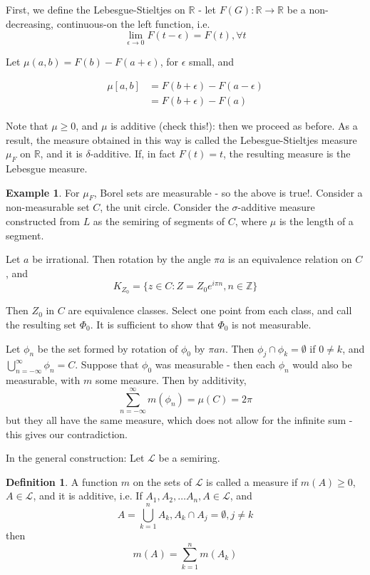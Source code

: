 \documentclass[11pt,a4paper]{report}
\theoremstyle{plain}
\theoremstyle{definition}
\newtheorem*{defn}{Definition}
\newtheorem*{eg}{Example}
\theoremstyle{remark}
\newcommand{\intersection}{\cap}
\newcommand{\Union}{\bigcup}
\newcommand{\R}{\mathbb{R}}
\newcommand{\Z}{\mathbb{Z}}
\newcommand{\cL}{\mathcal{L}}
\begin{document}
First, we define the Lebesgue-Stieltjes on $\R$ - let $F(G): \R \rightarrow \R$ be a non-decreasing, continuous-on the left function, i.e. $$ \lim_{\epsilon \rightarrow 0} F(t - \epsilon) = F(t), \forall t $$

Let $\mu(a, b) = F(b) - F(a + \epsilon)$, for $\epsilon$ small, and 

\begin{align*}
    \mu[a, b] &= F(b + \epsilon) - F(a - \epsilon) \\
              &= F(b + \epsilon) - F(a)
\end{align*}

Note that $\mu \ge 0$, and $\mu$ is additive (check this!): then we proceed as before. As a result, the measure obtained in this way is called the Lebesgue-Stieltjes measure $\mu_F$ on $\R$, and it is $\delta$-additive. If, in fact $F(t) = t$, the resulting measure is the Lebesgue measure.

\begin{eg}
  For $\mu_F$, Borel sets are measurable - so the above is true!. Consider a non-measurable set $C$, the unit circle. Consider the $\sigma$-additive measure constructed from $L$ as the semiring of segments of $C$, where $\mu$ is the length of a segment.

  Let $a$ be irrational. Then rotation by the angle $\pi a$ is an equivalence relation on $C$, and $$ K_{Z_0} = \{ z \in C : Z = Z_0 e^{i\pi n}, n \in \Z \} $$

    Then $Z_{0}$ in $C$ are equivalence classes. Select one point from each class, and call the resulting set $\Phi_{0}$. It is sufficient to show that $\Phi_0$ is not measurable.

    Let $\phi_n$ be the set formed by rotation of $\phi_0$ by $\pi a n$. Then $\phi_j \intersection \phi_k = \emptyset$ if $0 \ne k$, and $\Union_{n = -\infty}^\infty \phi_n = C $. Suppose that $\phi_0$ was measurable - then each $\phi_n$ would also be measurable, with $m$ some measure. Then by additivity, $$ \sum_{n = -\infty}^\infty m(\phi_n) = \mu(C) = 2\pi $$ but they all have the same measure, which does not allow for the infinite sum - this gives our contradiction.
\end{eg}

In the general construction: Let $\cL$ be a semiring.

\begin{defn}
    A function $m$ on the sets of $\cL$ is called a measure if $m(A) \ge 0$, $A \in \cL$, and it is additive, i.e. If $A_1, A_2, \dots A_n, A \in \cL$, and $$ A = \Union_{k=1}^n A_k, A_k \intersection A_j = \emptyset, j \ne k $$ then $$ m(A) = \sum_{k=1}^n m(A_k) $$
\end{defn}
\end{document}
